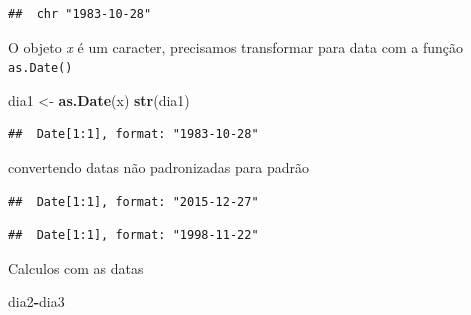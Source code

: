 \documentclass[
]{book}
\newenvironment{Shaded}{\begin{snugshade}}{\end{snugshade}}
\newcommand{\DataTypeTok}[1]{\textcolor[rgb]{0.13,0.29,0.53}{#1}}
\newcommand{\KeywordTok}[1]{\textcolor[rgb]{0.13,0.29,0.53}{\textbf{#1}}}
\newcommand{\NormalTok}[1]{#1}
\newcommand{\OperatorTok}[1]{\textcolor[rgb]{0.81,0.36,0.00}{\textbf{#1}}}
\newcommand{\StringTok}[1]{\textcolor[rgb]{0.31,0.60,0.02}{#1}}
\begin{document}
\begin{verbatim}
##  chr "1983-10-28"
\end{verbatim}

O objeto \emph{x} é um caracter, precisamos transformar para data com a função \texttt{as.Date()}

\begin{Shaded}
\begin{Highlighting}[]
\NormalTok{dia1 <-}\StringTok{ }\KeywordTok{as.Date}\NormalTok{(x)}
\KeywordTok{str}\NormalTok{(dia1)}
\end{Highlighting}
\end{Shaded}

\begin{verbatim}
##  Date[1:1], format: "1983-10-28"
\end{verbatim}

convertendo datas não padronizadas para padrão

\begin{Shaded}
\end{Shaded}

\begin{verbatim}
##  Date[1:1], format: "2015-12-27"
\end{verbatim}

\begin{Shaded}
\end{Shaded}

\begin{verbatim}
##  Date[1:1], format: "1998-11-22"
\end{verbatim}

Calculos com as datas

\begin{Shaded}
\begin{Highlighting}[]
\NormalTok{dia2}\OperatorTok{-}\NormalTok{dia3}
\end{Highlighting}
\end{Shaded}
\end{document}
